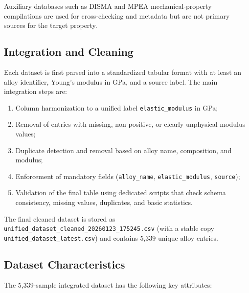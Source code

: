 \documentclass[11pt,a4paper]{article}
\begin{document}
Auxiliary databases such as DISMA and MPEA mechanical-property compilations are used for cross-checking and metadata but are not primary sources for the target property.

\subsection{Integration and Cleaning}

Each dataset is first parsed into a standardized tabular format with at least an alloy identifier, Young's modulus in \si{GPa}, and a source label. The main integration steps are:

\begin{enumerate}
  \item Column harmonization to a unified label \texttt{elastic\_modulus} in GPa;
  \item Removal of entries with missing, non-positive, or clearly unphysical modulus values;
  \item Duplicate detection and removal based on alloy name, composition, and modulus;
  \item Enforcement of mandatory fields (\texttt{alloy\_name}, \texttt{elastic\_modulus}, \texttt{source});
  \item Validation of the final table using dedicated scripts that check schema consistency, missing values, duplicates, and basic statistics.
\end{enumerate}

The final cleaned dataset is stored as \texttt{unified\_dataset\_cleaned\_20260123\_175245.csv} (with a stable copy \texttt{unified\_dataset\_latest.csv}) and contains 5{,}339 unique alloy entries.

\subsection{Dataset Characteristics}

The 5{,}339-sample integrated dataset has the following key attributes:
\end{document}
